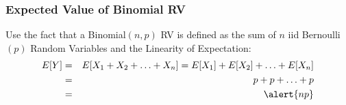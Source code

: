 %
%
% 
%
%
%
\begin{frame}
\frametitle{Expected Value of Binomial RV}

Use the fact that a Binomial$(n,p)$ RV is defined as the sum of $n$ iid Bernoulli$(p)$ Random Variables and the Linearity of Expectation:
\begin{eqnarray*}
E[Y] &=& E[X_1 + X_2 + \hdots + X_n] =  E[X_1] + E[X_2] + \hdots +E[X_n]\\
	&=& p + p + \hdots + p\\
	&=&  \alert{np}
\end{eqnarray*}
\vspace{3em}
\end{frame}

